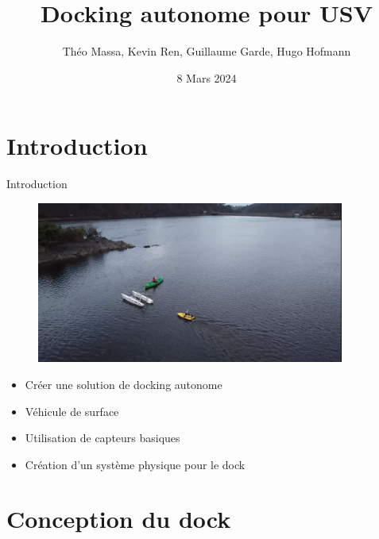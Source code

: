 \documentclass[pdftex,beamer,aspectratio=169]{beamer}
\title[Docking]{Docking autonome pour USV}
\author[]{Théo Massa, Kevin Ren, Guillaume Garde, Hugo Hofmann}
\date{8 Mars 2024}
\institute{ENSTA Bretagne-Lab STICC-Université Bretagne Sud}
\theoremstyle{definition}
\theoremstyle{example}
\theoremstyle{plain}
\begin{document}
\frame{\titlepage}

\begin{frame}[allowframebreaks]
  \tableofcontents
\end{frame}

\section{Introduction} 
\begin{frame}{Introduction}
  \begin{minipage}{0.6\textwidth}
    \begin{figure}
      \centering
      \includegraphics[width=0.9\textwidth]{img_lac.png}
    \end{figure}
  \end{minipage}\hfill
  \begin{minipage}{0.39\textwidth}
    \begin{itemize}
      \item Créer une solution de docking autonome
      \item Véhicule de surface
      \item Utilisation de capteurs basiques
      \item Création d'un système physique pour le dock
    \end{itemize}
  \end{minipage}
\end{frame}

\section{Conception du dock}
\end{document}
